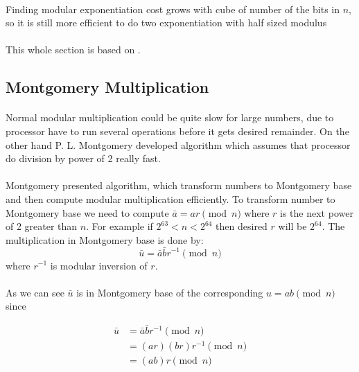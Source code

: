 \documentclass[thesis=B,english]{FITthesis}[2012/10/20]
\begin{document}
{{\paragraph*{}
{Finding modular exponentiation cost grows with cube of number of the bits in \(n\), so it is still more efficient to do two exponentiation with half sized modulus}

\paragraph*{}{This whole section is based on \cite{di-mgt}.}

\subsection{Montgomery Multiplication}

\paragraph*{}
{Normal modular multiplication could be quite slow for large numbers, due to processor have to run several operations before it gets desired remainder. On the other hand P. L. Montgomery developed algorithm which assumes that processor do division by power of 2 really fast.}
\paragraph*{}{
Montgomery presented algorithm, which transform numbers to Montgomery base and then compute modular multiplication efficiently. To transform number to Montgomery base we need to compute \(\bar{a} = ar \pmod{n}\) where \(r\) is the next  power of 2 greater than \(n\). For example if \(2^{63} < n < 2^{64}\) then desired \(r\) will be \(2^{64}\). The multiplication in Montgomery base is done by: \[\bar{u} = \bar{a}\bar{b}r^{-1} \pmod{n}\] where \(r^{-1}\) is modular inversion of \(r\).
}
\paragraph*{}{
As we can see \(\bar{u}\) is in Montgomery base of the corresponding 
\(u = ab \pmod{n}\) 
since}

\begin{equation}
\begin{split}
\bar{u} & = \bar{a}\bar{b}r^{-1} \pmod{n} \\
 & = (ar)(br)r^{-1} \pmod{n} \\
 & = (ab)r \pmod{n}
\end{split}
\end{equation}
\medskip

}}
\end{document}
